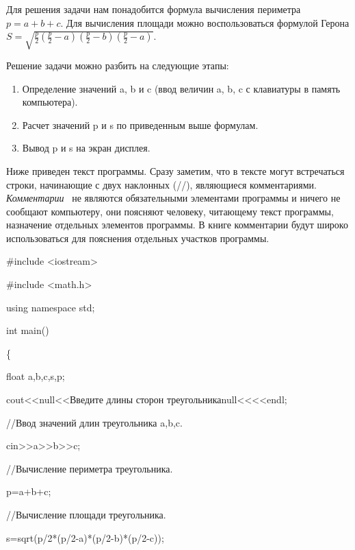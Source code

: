 Для решения задачи нам понадобится формула вычисления периметра  $p=a+b+c$. Для вычисления площади можно воспользоваться
формулой Герона  $S=\sqrt{\frac{p}{2}\left(\frac{p}{2}-a\right)\left(\frac{p}{2}-b\right)\left(\frac{p}{2}-a\right)}$.

Решение задачи можно разбить на следующие этапы:

\begin{enumerate}
\item  Определение значений a, b и c (ввод величин a, b, c с клавиатуры в память компьютера).
\item  Расчет значений p и s по приведенным выше формулам.
\item Вывод p и s на экран дисплея.
\end{enumerate}
Ниже приведен текст программы. Сразу заметим, что в тексте могут встречаться строки, начинающие с двух наклонных (//),
являющиеся комментариями. \textit{Комментарии}%
~не являются обязательными элементами программы и ничего не сообщают компьютеру, они поясняют человеку, читающему текст
программы, назначение отдельных элементов программы. В книге комментарии будут широко использоваться для пояснения
отдельных участков программы.

{\upshape
\#include {\textless}iostream{\textgreater} }

{\upshape
\#include {\textless}math.h{\textgreater} }

{\upshape
using namespace std; }

{\upshape
int main() }

{\upshape
\{ }

{\upshape
 float a,b,c,s,p; }

{\upshape
 cout{\textless}{\textless}null{<<}Введите длины сторон треугольникаnull{<<}{\textless}{\textless}endl; }

{\upshape
//Ввод значений длин треугольника a,b,c.}

{\upshape
 cin{\textgreater}{\textgreater}a{\textgreater}{\textgreater}b{\textgreater}{\textgreater}c; }

{\upshape
//Вычисление периметра треугольника.}

{\upshape
 p=a+b+c; }

{\upshape
//Вычисление площади треугольника.}

{\upshape
 s=sqrt(p/2*(p/2-a)*(p/2-b)*(p/2-c));}

